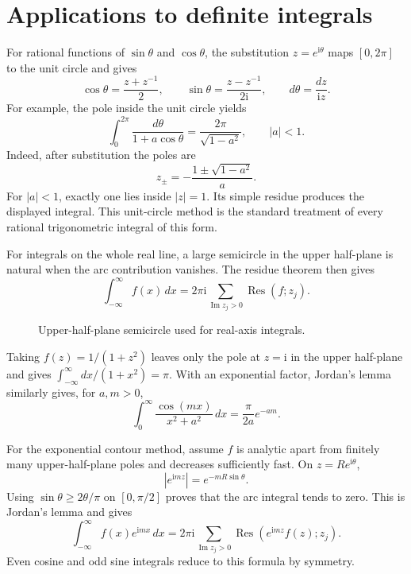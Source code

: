 \section{Applications to definite integrals}

For rational functions of $\sin\theta$ and $\cos\theta$, the substitution $z=e^{\mathrm{i}\theta}$ maps $[0,2\pi]$ to the unit circle and gives
\begin{equation}
\cos\theta=\frac{z+z^{-1}}{2},\qquad
\sin\theta=\frac{z-z^{-1}}{2\mathrm{i}},\qquad d\theta=\frac{dz}{\mathrm{i}z}.
\end{equation}
For example, the pole inside the unit circle yields
\begin{equation}
\int_0^{2\pi}\frac{d\theta}{1+a\cos\theta}=\frac{2\pi}{\sqrt{1-a^2}},\qquad |a|<1.
\end{equation}
Indeed, after substitution the poles are
\begin{equation}
z_{\pm}=-\frac{1\pm\sqrt{1-a^2}}{a}.
\end{equation}
For $|a|<1$, exactly one lies inside $|z|=1$. Its simple residue produces the displayed integral. This unit-circle method is the standard treatment of every rational trigonometric integral of this form.

For integrals on the whole real line, a large semicircle in the upper half-plane is natural when the arc contribution vanishes. The residue theorem then gives
\begin{equation}
\int_{-\infty}^{\infty}f(x)\,dx=2\pi\mathrm{i}\sum_{\operatorname{Im}z_j>0}\operatorname{Res}(f;z_j).
\end{equation}

\begin{figure}[htb]
    \centering
    \caption{Upper-half-plane semicircle used for real-axis integrals.}
    \label{fig:ch06-semicircle}
\end{figure}

Taking $f(z)=1/(1+z^2)$ leaves only the pole at $z=\mathrm{i}$ in the upper half-plane and gives $\int_{-\infty}^{\infty}dx/(1+x^2)=\pi$. With an exponential factor, Jordan's lemma similarly gives, for $a,m>0$,
\begin{equation}
\int_0^\infty\frac{\cos(mx)}{x^2+a^2}\,dx=\frac{\pi}{2a}e^{-am}.
\end{equation}

For the exponential contour method, assume $f$ is analytic apart from finitely many upper-half-plane poles and decreases sufficiently fast. On $z=Re^{\mathrm{i}\theta}$,
\begin{equation}
|e^{\mathrm{i}mz}|=e^{-mR\sin\theta}.
\end{equation}
Using $\sin\theta\geq2\theta/\pi$ on $[0,\pi/2]$ proves that the arc integral tends to zero. This is Jordan's lemma and gives
\begin{equation}
\int_{-\infty}^{\infty}f(x)e^{\mathrm{i}mx}\,dx
=2\pi\mathrm{i}\sum_{\operatorname{Im}z_j>0}\operatorname{Res}\left(e^{\mathrm{i}mz}f(z);z_j\right).
\end{equation}
Even cosine and odd sine integrals reduce to this formula by symmetry.

